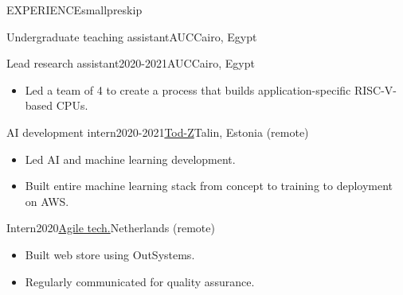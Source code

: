 \documentclass{resume}
\begin{document}
\begin{minipage}[t]{0.45\textwidth}
\begin{rsection}{\MakeUppercase{experience}}{smallpreskip}
\begin{rcontent}{Undergraduate teaching assistant}{}{AUC}{Cairo, Egypt}
\begin{itemize}
			\end{itemize}
		\end{rcontent}
		\divider
		\begin{rcontent}{Lead research assistant}{2020-2021}{AUC}{Cairo, Egypt}
			\begin{itemize}
				\item Led a team of 4 to create a process that builds application-specific RISC-V-based CPUs.
			\end{itemize}
		\end{rcontent}
		\divider
		\begin{rcontent}{AI development intern}{2020-2021}{\href{https://www.tod-z.com/}{Tod-Z}}{Talin, Estonia (remote)}
			\begin{itemize}
				\item Led AI and machine learning development.
				\item Built entire machine learning stack from concept to training to deployment on AWS.
			\end{itemize}
		\end{rcontent}
		\divider
		\begin{rcontent}{Intern}{2020}{\href{https://www.agiletz.com/}{Agile tech.}}{Netherlands (remote)}
			\begin{itemize}
				\item Built web store using OutSystems.
				\item Regularly communicated for quality assurance.
			\end{itemize}
		\end{rcontent}

	\end{rsection}


\end{minipage}
\end{document}
